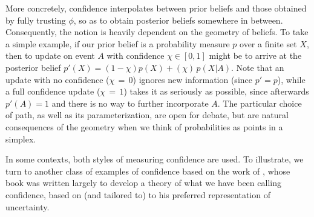 More concretely, confidence interpolates between prior beliefs and those obtained by fully trusting $\phi$, so as to obtain posterior beliefs somewhere in between. 
Consequently, the notion is heavily dependent on the geometry of beliefs.
To take a simple example,
if our prior belief is a probability measure $p$ over a finite set $X$, then to update on event $A$ with confidence $\chi \in [0,1]$ might be to arrive at the posterior belief $p'(X) = (1-\chi) p(X) + (\chi)\, p(X|A)$. 
Note that 
an update with no confidence ($\chi{\,=\,}0$) ignores new information (since $p' \!=\! p$),
while a
full confidence update ($\chi{\,=\,}1$) takes it as seriously as possible,
since afterwards $p'(A) \!=\! 1$ and there is no way to further incorporate $A$.
%
%
The particular choice of path, as well as its parameterization,
are open for debate, but are natural consequences of the geometry when we think of probabilities as points in a simplex.



\relax %
    In some contexts, both styles of measuring confidence are used. To
    illustrate, we turn to another class of examples of confidence
    based on the work of \citeauthor{shafer1976mathematical}, whose
    \citeyear{shafer1976mathematical} book was written largely to
    develop a theory of what we have been calling confidence, based on
    (and tailored to) to his preferred representation of uncertainty. 


